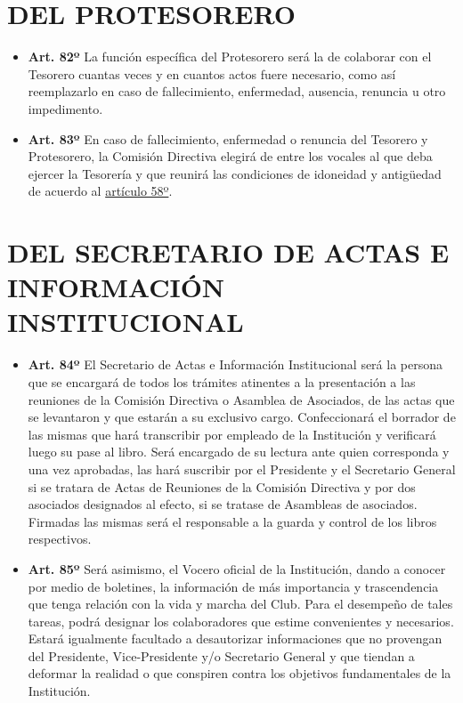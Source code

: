 \documentclass[]{book}
\providecommand{\tightlist}{%
  \setlength{\itemsep}{0pt}\setlength{\parskip}{0pt}}
\begin{document}
\hypertarget{cap14}{%
\chapter{DEL PROTESORERO}\label{cap14}}

\begin{itemize}
\tightlist
\item
  \textbf{Art. 82º}
  La función específica del Protesorero será la de colaborar con el Tesorero cuantas veces y en cuantos actos fuere necesario, como así reemplazarlo en caso de fallecimiento, enfermedad, ausencia, renuncia u otro impedimento.
\end{itemize}

\begin{itemize}
\tightlist
\item
  \textbf{Art. 83º}
  En caso de fallecimiento, enfermedad o renuncia del Tesorero y Protesorero, la Comisión Directiva elegirá de entre los vocales al que deba ejercer la Tesorería y que reunirá las condiciones de idoneidad y antigüedad de acuerdo al \protect\hyperlink{art58}{artículo 58º}.
\end{itemize}

\hypertarget{cap15}{%
\chapter{DEL SECRETARIO DE ACTAS E INFORMACIÓN INSTITUCIONAL}\label{cap15}}

\begin{itemize}
\tightlist
\item
  \textbf{Art. 84º}
  El Secretario de Actas e Información Institucional será la persona que se encargará de todos los trámites atinentes a la presentación a las reuniones de la Comisión Directiva o Asamblea de Asociados, de las actas que se levantaron y que estarán a su exclusivo cargo. Confeccionará el borrador de las mismas que hará transcribir por empleado de la Institución y verificará luego su pase al libro. Será encargado de su lectura ante quien corresponda y una vez aprobadas, las hará suscribir por el Presidente y el Secretario General si se tratara de Actas de Reuniones de la Comisión Directiva y por dos asociados designados al efecto, si se tratase de Asambleas de asociados. Firmadas las mismas será el responsable a la guarda y control de los libros respectivos.
\end{itemize}

\begin{itemize}
\tightlist
\item
  \textbf{Art. 85º}
  Será asimismo, el Vocero oficial de la Institución, dando a conocer por medio de boletines, la información de más importancia y trascendencia que tenga relación con la vida y marcha del Club. Para el desempeño de tales tareas, podrá designar los colaboradores que estime convenientes y necesarios. Estará igualmente facultado a desautorizar informaciones que no provengan del Presidente, Vice-Presidente y/o Secretario General y que tiendan a deformar la realidad o que conspiren contra los objetivos fundamentales de la Institución.
\end{itemize}
\end{document}
